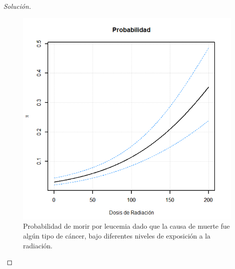 \documentclass[10.5pt,notitlepage]{article}
\newenvironment{solucion}
  {\begin{proof}[Solución]}
  {\end{proof}}
\theoremstyle{plain}
\begin{document}
\begin{solucion}
\begin{figure}
    \centering
    \includegraphics[scale= 0.65]{Im2Ej4.png}
    \caption{Probabilidad de morir por leucemia dado que la causa de muerte fue algún tipo de cáncer, bajo diferentes niveles de exposición a la radiación.}
    \label{fig:nuevanueva}
\end{figure}
  
 
\end{solucion}
\end{document}
